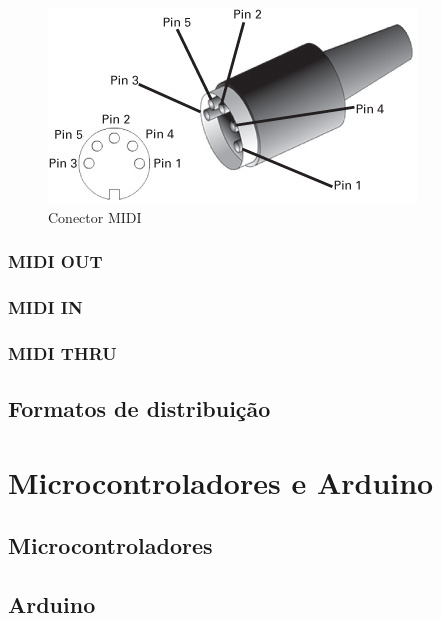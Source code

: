             \begin{figure}[!h]
            	\centering
            	\includegraphics[scale=0.8]{Imagens/MIDI_connector.jpg}
            	\caption[Conector MIDI]{Conector MIDI}
            	\label{fig:MIDI_connector}
            \end{figure}
        
            \subsubsection{MIDI OUT}



            \subsubsection{MIDI IN}



            \subsubsection{MIDI THRU}
        


        \subsection{Formatos de distribuição}
        
        
        
    \section{Microcontroladores e Arduino}



        \subsection{Microcontroladores}



        \subsection{Arduino}


